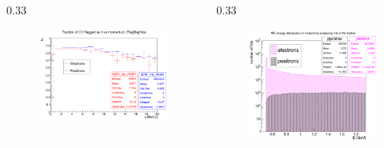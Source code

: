 \documentclass{beamer}
\begin{document}
\begin{frame}
\begin{columns}
    \begin{column}{0.33\framewidth}
        \begin{figure}[!h]
            \centering
            \hspace*{-1em}
            \includegraphics[width =1.2\columnwidth]{figures/png/Screenshot_20240818_155835.png}
           \label{fig:0pbarbefore}
\end{figure}
    \end{column}
      \begin{column}{0.33\framewidth}
        \begin{figure}[!h]
            \centering
                        \hspace*{-0.2em}
            \includegraphics[width =1.\columnwidth]{figures/png/Screenshot_20240820_154854.png}

\end{figure}
\end{column}
\end{columns}
\end{frame}
\end{document}
